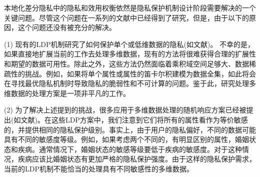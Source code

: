 本地化差分隐私中的隐私和效用权衡依然是隐私保护机制设计阶段需要解决的一个关键问题。尽管这个问题在一系列的文献中已经得到了研究\cite{holohan2017optimal,kalantari2018robust,rassouli2020optimal}，但是，由于以下的原因，这个问题还没有被充分的解决。

(1) 现有的LDP机制研究了如何保护单个或低维数据的隐私(如文献)。 不幸的是，如果直接地扩展当前的工作去处理多维数据，现有的方法将很难获得合理的扩展性和期望的数据可用性。除此之外，这些方法仍然面临着乘积域空间足够大、数据稀疏性的挑战。例如，如果将单个属性或属性的笛卡尔积建模为数据全集，如此将会在寻找最优隐私机制时导致隐私的脆弱性和不可计算的问题。鉴于此，研究处理多维数据的处理方案是一项非平凡的工作。

(2) 为了解决上述提到的挑战，很多应用于多维数据处理的随机响应方案已经被提出(如文献)。在这些LDP方案中，我们注意到它们将所有的属性看作为等价敏感的，并提供相同的隐私保护级别。事实上，由于用户的隐私偏好，不同的数据可能具有不同的敏感度等级\cite{murakami2019utility,gu2020providing}。例如，如果考虑两个不同的，有明显区别的属性，婚姻状态和疾病。通常情况下，婚姻状态的敏感等级要低于疾病的敏感度。对于这种情况，疾病应该比婚姻状态有更加严格的隐私保护强度。由于这样的隐私保护需求，当前的LDP机制不能恰当的处理具有不同敏感性的多维数据。

%

